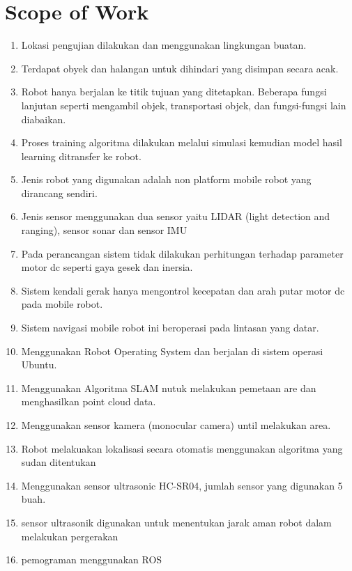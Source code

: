     
\section{Scope of Work}

\begin{enumerate}
	\item Lokasi pengujian dilakukan dan menggunakan lingkungan buatan.
	\item Terdapat obyek dan halangan untuk dihindari yang disimpan secara acak.
	\item Robot hanya berjalan ke titik tujuan yang ditetapkan. Beberapa fungsi lanjutan seperti mengambil objek, transportasi objek, dan fungsi-fungsi lain diabaikan.
	\item Proses training algoritma dilakukan melalui simulasi kemudian model hasil learning ditransfer ke robot.
	\item Jenis robot yang digunakan adalah non platform mobile robot yang dirancang sendiri.
	\item Jenis sensor menggunakan dua sensor yaitu LIDAR (light detection and ranging), sensor sonar dan sensor IMU
	\item Pada perancangan sistem tidak dilakukan perhitungan terhadap parameter motor dc seperti gaya gesek dan inersia.
	\item Sistem kendali gerak hanya mengontrol kecepatan dan arah putar motor dc pada mobile robot.
	\item Sistem navigasi mobile robot ini beroperasi pada lintasan yang datar.
	\item Menggunakan Robot Operating System dan berjalan di sistem operasi Ubuntu.
	\item Menggunakan Algoritma SLAM nutuk melakukan pemetaan are dan menghasilkan point cloud data.
	\item Menggunakan sensor kamera (monocular camera) until melakukan area.
	\item Robot melakuakan lokalisasi secara otomatis menggunakan algoritma yang sudan ditentukan
	\item Menggunakan sensor ultrasonic HC-SR04, jumlah sensor yang digunakan 5 buah.
	\item sensor ultrasonik digunakan untuk menentukan jarak aman robot dalam melakukan pergerakan
	\item pemograman menggunakan ROS
\end{enumerate}


